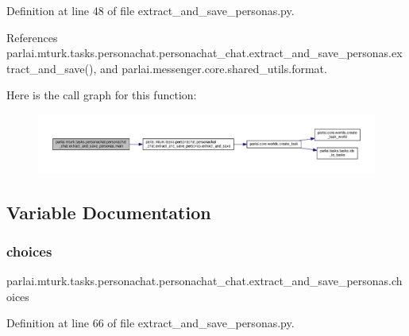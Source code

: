 Definition at line 48 of file extract\+\_\+and\+\_\+save\+\_\+personas.\+py.



References parlai.\+mturk.\+tasks.\+personachat.\+personachat\+\_\+chat.\+extract\+\_\+and\+\_\+save\+\_\+personas.\+extract\+\_\+and\+\_\+save(), and parlai.\+messenger.\+core.\+shared\+\_\+utils.\+format.

Here is the call graph for this function\+:
\nopagebreak
\begin{figure}[H]
\begin{center}
\leavevmode
\includegraphics[width=350pt]{namespaceparlai_1_1mturk_1_1tasks_1_1personachat_1_1personachat__chat_1_1extract__and__save__personas_a3fadfe6571f33f89367defbb1d3907e0_cgraph}
\end{center}
\end{figure}


\subsection{Variable Documentation}
\mbox{\label{namespaceparlai_1_1mturk_1_1tasks_1_1personachat_1_1personachat__chat_1_1extract__and__save__personas_a2def58d59437334ec072a3d644c0a577}} 
\subsubsection{\texorpdfstring{choices}{choices}}
{\footnotesize\ttfamily parlai.\+mturk.\+tasks.\+personachat.\+personachat\+\_\+chat.\+extract\+\_\+and\+\_\+save\+\_\+personas.\+choices}



Definition at line 66 of file extract\+\_\+and\+\_\+save\+\_\+personas.\+py.



